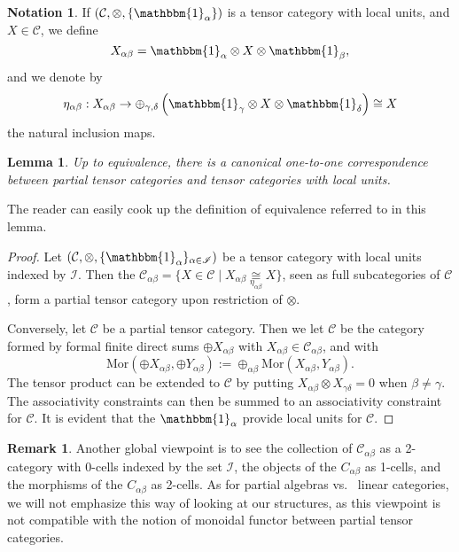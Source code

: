 \documentclass[11pt]{article}
\newcommand{\CatC}{\mathcal{C}}
\newcommand{\CatCC}{\mathscr{C}}
\newcommand{\Mor}{\mathrm{Mor}}
\newcommand{\Unitb}{\mathbbm{1}}
\newtheorem{Lem}[Theorem]{Lemma}
\theoremstyle{definition}
\newtheorem{Rem}[Theorem]{Remark}
\newtheorem{Not}[Theorem]{Notation}
\numberwithin{equation}{section}
\begin{document}
\begin{Not} If $(\CatC,\otimes,\{\Unitb_\alpha\})$ is a tensor category with local units, and $X\in \CatC$, we define \[X_{\alpha\beta} = \Unitb_\alpha\otimes X \otimes \Unitb_\beta,\] and we denote by \[\eta_{\alpha\beta}:X_{\alpha\beta} \rightarrow \oplus_{\gamma,\delta} \left(\Unitb_\gamma \otimes X \otimes \Unitb_\delta\right) \cong X\] the natural inclusion maps. 
\end{Not}

\begin{Lem} Up to equivalence, there is a canonical one-to-one correspondence between partial tensor categories and tensor categories with local units. 
\end{Lem}

The reader can easily cook up the definition of equivalence referred to in this lemma.

\begin{proof} Let $(\CatC,\otimes,\{\Unitb_\alpha\}_{\alpha\in \mathscr{I}})$ be a tensor category with local units indexed by $\mathscr{I}$. Then the $\CatC_{\alpha\beta} = \{X \in \CatC\mid X_{\alpha\beta} \underset{\eta_{\alpha\beta}}{\cong} X\}$, seen as full subcategories of $\CatC$, form a partial tensor category upon restriction of $\otimes$.

Conversely, let $\CatCC$ be a partial tensor category. Then we let $\CatC$ be the category formed by formal finite direct sums $\oplus X_{\alpha\beta}$ with $X_{\alpha\beta}\in \CatC_{\alpha\beta}$, and with \[\Mor(\oplus X_{\alpha\beta},\oplus Y_{\alpha\beta}) := \oplus_{\alpha\beta} \Mor(X_{\alpha\beta},Y_{\alpha\beta}).\] The tensor product can be extended to $\CatC$ by putting $X_{\alpha\beta} \otimes X_{\gamma\delta} = 0$ when $\beta\neq \gamma$. The associativity constraints can then be summed to an associativity constraint for $\CatC$. It is evident that the $\Unitb_\alpha$ provide local units for $\CatC$. 
\end{proof}

\begin{Rem} Another global viewpoint is to see the collection of $\CatC_{\alpha\beta}$ as a 2-category with 0-cells indexed by the set $\mathscr{I}$, the objects of the $C_{\alpha\beta}$ as 1-cells, and  the morphisms of the $C_{\alpha\beta}$ as 2-cells. As for partial algebras vs.~ linear categories, we will not emphasize this way of looking at our structures, as this viewpoint is not compatible with the notion of monoidal functor between partial tensor categories.
\end{Rem} 
\end{document}
